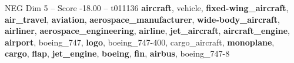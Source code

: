 \begin{textsample}{NEG Dim 5 – Score -18.00 – t011136}  \label{ex:f5_neg_017}
\textbf{aircraft}, vehicle, \textbf{fixed-wing\_aircraft}, \textbf{air\_travel}, \textbf{aviation}, \textbf{aerospace\_manufacturer}, \textbf{wide-body\_aircraft}, \textbf{airliner}, \textbf{aerospace\_engineering}, \textbf{airline}, \textbf{jet\_aircraft}, \textbf{aircraft\_engine}, \textbf{airport}, boeing\_747, \textbf{logo}, boeing\_747-400, cargo\_aircraft, \textbf{monoplane}, \textbf{cargo}, \textbf{flap}, \textbf{jet\_engine}, \textbf{boeing}, \textbf{fin}, \textbf{airbus}, boeing\_747-8

\end{textsample}
